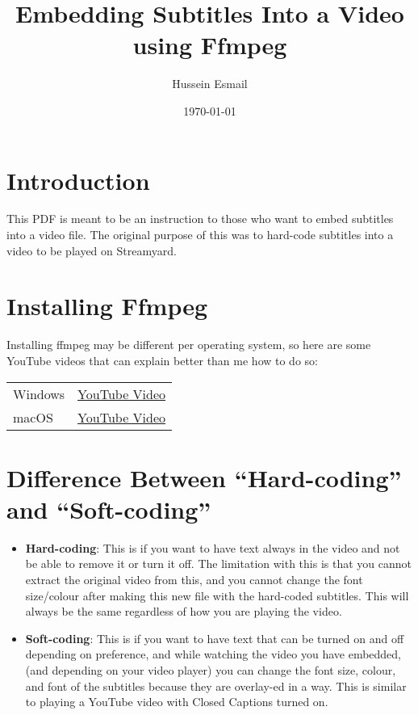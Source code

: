 \documentclass{article}
\title{Embedding Subtitles Into a Video using Ffmpeg}
\author{Hussein Esmail}
\date{\today} %
\begin{document}
\maketitle
\newpage
\tableofcontents
\newpage

\section{Introduction}
This PDF is meant to be an instruction to those who want to embed subtitles into a video file. The original purpose of this was to hard-code subtitles into a video to be played on Streamyard.

\section{Installing Ffmpeg}
Installing ffmpeg may be different per operating system, so here are some YouTube videos that can explain better than me how to do so:

\begin{tabular}{l|l}
    Windows &   \href{https://youtu.be/r1AtmY-RMyQ}{\underline{YouTube Video}} \\
    macOS &     \href{https://youtu.be/sQsy66vI0xw}{\underline{YouTube Video}}
\end{tabular}
\section{Difference Between ``Hard-coding'' and ``Soft-coding''}
\begin{itemize}
    \item \textbf{Hard-coding}: This is if you want to have text always in the video and not be able to remove it or turn it off. The limitation with this is that you cannot extract the original video from this, and you cannot change the font size/colour after making this new file with the hard-coded subtitles. This will always be the same regardless of how you are playing the video.
    \item \textbf{Soft-coding}: This is if you want to have text that can be turned on and off depending on preference, and while watching the video you have embedded, (and depending on your video player) you can change the font size, colour, and font of the subtitles because they are overlay-ed in a way. This is similar to playing a YouTube video with Closed Captions turned on.
\end{itemize}
\end{document}
